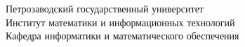 \documentclass[a4paper,12pt]{article}
\renewcommand{\baselinestretch}{1.5}
\begin{document}
%                         
%

\thispagestyle{empty}

%
\begin{center}
  \renewcommand{\baselinestretch}{1}
  {\large
    {\sc
      Петрозаводский государственный университет\\
      Институт математики и информационных технологий\\
      Кафедра информатики и математического обеспечения\\
    }
  }
\end{center}
\end{document}
